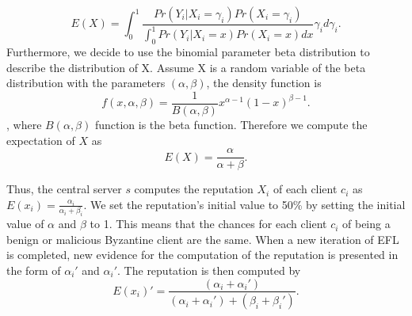 \documentclass[lettersize,journal]{IEEEtran}
\begin{document}
\begin{equation}
  E(X)=\int_{0}^{1}\frac{Pr\left ( Y_{i}|X_{i}=\gamma_{i} \right )Pr(X_{i}=\gamma_{i})}{\int_{0}^{1}Pr\left ( Y_{i}|X_{i}=x \right )Pr(X_{i}=x)dx}\gamma_{i}d\gamma_{i}\label{equation_3}.
\end{equation}
Furthermore, we decide to use the binomial parameter beta distribution to describe the distribution of X. Assume X is a random variable of the beta distribution with the parameters $(\alpha, \beta)$, the density function is
\begin{equation}
  f(x,\alpha,\beta)=\frac{1}{B(\alpha,\beta)}x^{\alpha-1}(1-x)^{\beta-1}\label{equation-4}.
\end{equation}
, where $B(\alpha, \beta)$ function is the beta function. Therefore we compute the expectation of $X$ as
\begin{equation}
  E(X)=\frac{\alpha}{\alpha+\beta}.
\end{equation}

Thus, the central server ${s}$ computes the reputation $X_i$ of each client ${c_{i}}$ as ${E(x_{i})=\frac{\alpha_{i}}{\alpha_{i}+\beta_{i}}}$. We set the reputation's initial value to 50\% by setting the initial value of $\alpha$ and $\beta$ to 1. This means that the chances for each client $c_ i$ of being a benign or malicious Byzantine client are the same. When a new iteration of EFL is completed, new evidence for the computation of the reputation is presented in the form of ${\alpha_{i}}'$ and ${\alpha_{i}}'$. The reputation is then computed by
\begin{equation}
  {E(x_{i})}'=\frac{(\alpha_{i}+{\alpha_{i}}')}{(\alpha_{i}+{\alpha_{i}}')+(\beta_{i}+{\beta_{i}}')}.
\end{equation}
\end{document}
